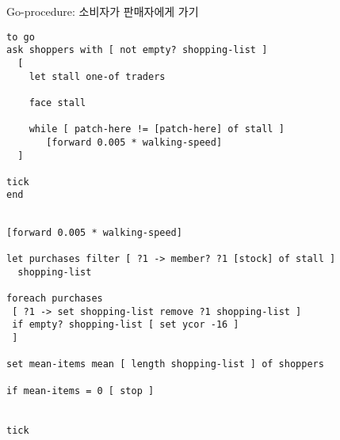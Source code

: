 \documentclass[hyperref={unicode}]{beamer}
\begin{document}
\begin{frame}[fragile]{Go-procedure: 소비자가 판매자에게 가기}
\begin{verbatim}
to go
ask shoppers with [ not empty? shopping-list ]
  [
    let stall one-of traders
    
    face stall
    
    while [ patch-here != [patch-here] of stall ]
       [forward 0.005 * walking-speed]
  ]
  
tick   
end

\end{verbatim}	
\end{frame}

\begin{frame}[fragile]
\begin{verbatim}

[forward 0.005 * walking-speed]

let purchases filter [ ?1 -> member? ?1 [stock] of stall ]
  shopping-list

foreach purchases
 [ ?1 -> set shopping-list remove ?1 shopping-list ] 
 if empty? shopping-list [ set ycor -16 ]
 ]

set mean-items mean [ length shopping-list ] of shoppers

if mean-items = 0 [ stop ]


tick
\end{verbatim}	
\end{frame}
\end{document}
